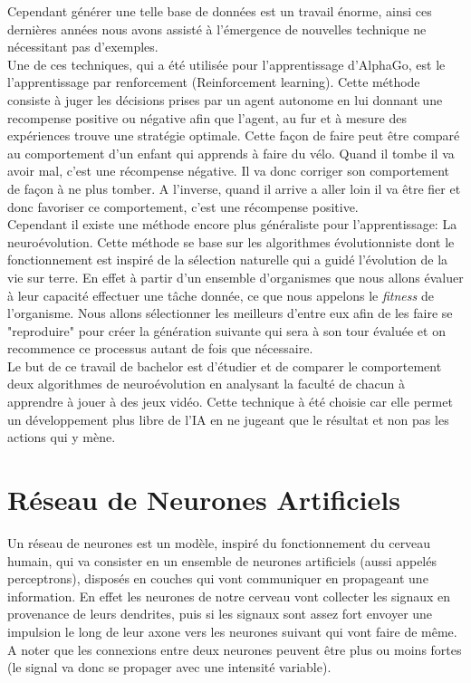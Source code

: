 \documentclass{article}
\begin{document}
Cependant générer une telle base de données est un travail énorme, ainsi ces dernières années nous avons assisté à l'émergence de nouvelles technique ne nécessitant pas d'exemples.\\

Une de ces techniques, qui a été utilisée pour l'apprentissage d'AlphaGo\cite{alphago}, est le l'apprentissage par renforcement (Reinforcement learning). Cette méthode consiste à juger les décisions prises par un agent autonome en lui donnant une recompense positive ou négative afin que l'agent, au fur et à mesure des expériences trouve une stratégie optimale.\cite{wikirl} Cette façon de faire peut être comparé au comportement d'un enfant qui apprends à faire du vélo. Quand il tombe il va avoir mal, c'est une récompense négative. Il va donc corriger son comportement de façon à ne plus tomber. A l'inverse, quand il arrive a aller loin il va être fier et donc favoriser ce comportement, c'est une récompense positive.\\

Cependant il existe une méthode encore plus généraliste pour l'apprentissage: La neuroévolution. Cette méthode se base sur les algorithmes évolutionniste dont le fonctionnement est inspiré de la sélection naturelle qui a guidé l'évolution de la vie sur terre. En effet à partir d'un ensemble d'organismes que nous allons évaluer à leur capacité effectuer une tâche donnée, ce que nous appelons le \textit{fitness} de l'organisme. Nous allons sélectionner les meilleurs d'entre eux afin de les faire se "reproduire" pour créer la génération suivante qui sera à son tour évaluée et on recommence ce processus autant de fois que nécessaire.\cite{wikineuroevolution}\\

Le but de ce travail de bachelor est d'étudier et de comparer le comportement deux algorithmes de neuroévolution en analysant la faculté de chacun à apprendre à jouer à des jeux vidéo. Cette technique à été choisie car elle permet un développement plus libre de l'IA en ne jugeant que le résultat et non pas les actions qui y mène.
\newpage
\section{Réseau de Neurones Artificiels}

Un réseau de neurones est un modèle, inspiré du fonctionnement du cerveau humain, qui va consister en un ensemble de neurones artificiels (aussi appelés perceptrons), disposés en couches qui vont communiquer en propageant une information.\cite{wikiann} En effet les neurones de notre cerveau vont collecter les signaux en provenance de leurs dendrites, puis si les signaux sont assez fort envoyer une impulsion le long de leur axone vers les neurones suivant qui vont faire de même. A noter que les connexions entre deux neurones peuvent être plus ou moins fortes (le signal va donc se propager avec une intensité variable).\cite{neuronswork}
\end{document}

